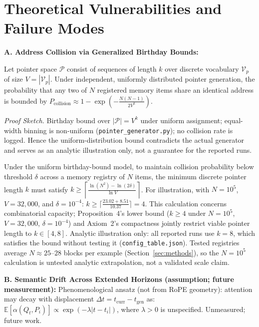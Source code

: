 \documentclass[runningheads]{llncs}
\begin{document}
{\section{Theoretical Vulnerabilities and Failure Modes}

\noindent\textbf{A. Address Collision via Generalized Birthday Bounds:}
\begin{proposition}\label{prop:collision}
Let pointer space $\mathcal{P}$ consist of sequences of length $k$ over discrete vocabulary $\mathcal{V}_p$ of size $V = |\mathcal{V}_p|$. Under independent, uniformly distributed pointer generation, the probability that any two of $N$ registered memory items share an identical address is bounded by $P_{\text{collision}} \approx 1 - \exp\left(-\frac{N(N-1)}{2 V^k}\right)$.
\end{proposition}

\textit{Proof Sketch.} Birthday bound over $|\mathcal{P}|=V^k$ under uniform assignment; equal-width binning is non-uniform (\texttt{pointer\_generator.py}); no collision rate is logged. Hence the uniform-distribution bound contradicts the actual generator and serves as an analytic illustration only, not a guarantee for the reported runs.

\begin{proposition}\label{prop:capacity}
Under the uniform birthday-bound model, to maintain collision probability below threshold $\delta$ across a memory registry of $N$ items, the minimum discrete pointer length $k$ must satisfy $k \ge \left\lceil \frac{\ln(N^2) - \ln(2 \delta)}{\ln V} \right\rceil$.
For illustration, with $N = 10^5$, $V = 32{,}000$, and $\delta = 10^{-4}$: $k \ge \lceil \frac{23.02 + 8.51}{10.37} \rceil = 4$.
This calculation concerns combinatorial capacity; Proposition~4's lower bound ($k \ge 4$ under $N=10^5$, $V=32{,}000$, $\delta=10^{-4}$) and Axiom~2's compactness jointly restrict viable pointer length to $k \in [4, 8]$. Analytic illustration only: all reported runs use $k=8$, which satisfies the bound without testing it (\texttt{config\_table.json}). Tested registries average $N{\approx}25$--$28$ blocks per example (Section~\ref{sec:methods}), so the $N{=}10^5$ calculation is untested analytic extrapolation, not a validated scale claim.
\end{proposition}

\noindent\textbf{B. Semantic Drift Across Extended Horizons (assumption; future measurement):}
Phenomenological ansatz (not from RoPE geometry): attention may decay with displacement $\Delta t = t_{\text{curr}} - t_{\text{gen}}$ as: $\mathbb{E}[\alpha(Q_t, P_i)] \propto \exp(-\lambda |t - t_i|)$, where $\lambda > 0$ is unspecified. Unmeasured; future work.

}
\end{document}

